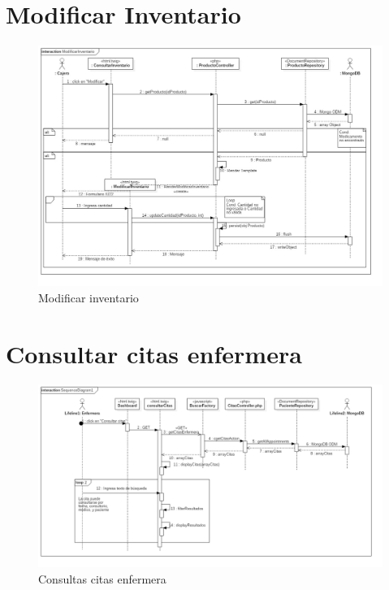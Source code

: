 \section{Modificar Inventario}
	\begin{figure}[htbp!]
		\centering
			\includegraphics[width=1\textwidth]{uml/DiagramasSecuencia/DemisGomez/modificarInventario}
		\caption{Modificar inventario}
	\end{figure}
	\newpage

\newpage
\section{Consultar citas enfermera}
\begin{figure}[htbp!]
		\centering
			\includegraphics[width=1\textwidth]{uml/DiagramasSecuencia/Trujillo/getCitasEnfermera}
		\caption{Consultas citas enfermera}
	\end{figure}
	\newpage
